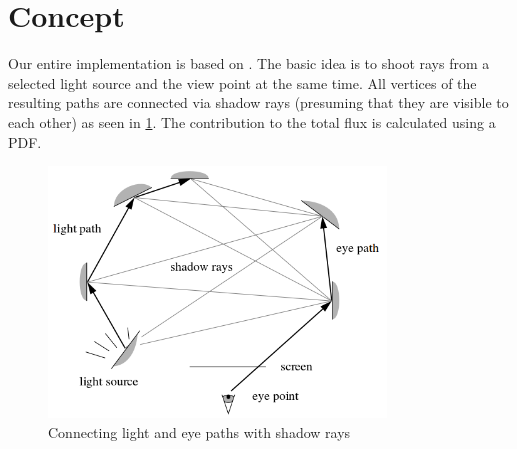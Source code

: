 \section{Concept}
Our entire implementation is based on \cite{lafortune1993bi}. The basic idea is to shoot rays from a selected light source and the view point at the same time. All vertices of the resulting paths are connected via shadow rays (presuming that they are visible to each other) as seen in \ref{fig:shadow_rays}. The contribution to the total flux is calculated using a PDF.

\begin{figure}[htbp]
  \centering
     \includegraphics[width=0.8\textwidth]{pics/bi_dir_shadow_rays.png}
  \caption{Connecting light and eye paths with shadow rays \cite{lafortune1993bi}}
  \label{fig:shadow_rays}
\end{figure}